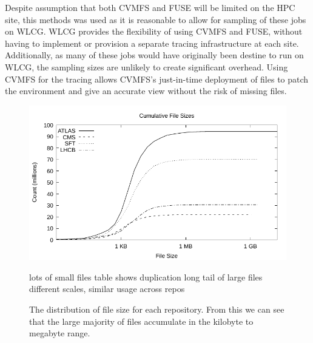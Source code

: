 \documentclass[sigconf]{acmart}
\begin{document}
Despite assumption that both CVMFS and FUSE will be limited
on the HPC site, this methods was used as it is reasonable to
allow for sampling of these jobs on WLCG. 
WLCG provides the flexibility of using CVMFS and FUSE, without
having to implement or provision a separate tracing infrastructure
at each site.
Additionally, as many of these jobs would have originally been 
destine to run on WLCG, the sampling sizes are unlikely to 
create significant overhead.
Using CVMFS for the tracing allows CVMFS's just-in-time deployment
of files to patch the environment and give an accurate view without
the risk of missing files.

\begin{figure}
\includegraphics[width=\linewidth]{curated/cdf/cdf.pdf}
\caption{The distribution of file size for each repository.
From this we can see that the large majority of files
accumulate in the kilobyte to megabyte range.}
\label{fig:cdf}
lots of small files
table shows duplication
long tail of large files
different scales, similar usage across repos

\fi
\end{figure}
\end{document}
